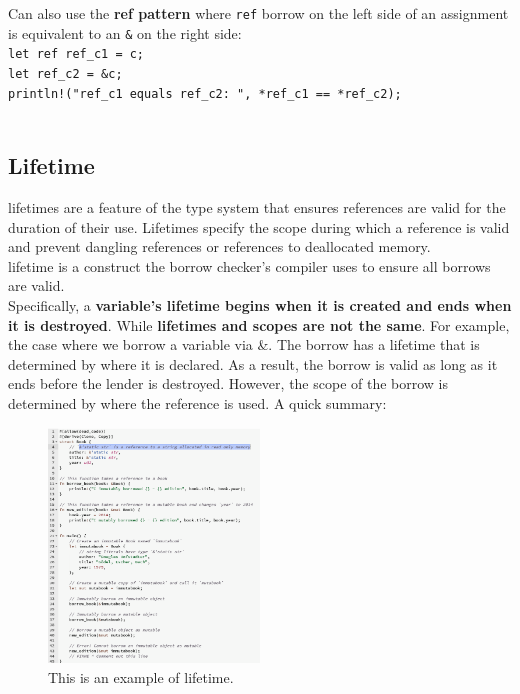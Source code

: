 \documentclass{article}
\begin{document}
Can also use the \textbf{ref pattern} where \texttt{ref} borrow on the left side of an assignment is equivalent to an \texttt{\&} on the right side:\\
\texttt{let ref ref\_c1 = c;}\\
\texttt{let ref\_c2 = \&c;}\\
\texttt{println!("ref\_c1 equals ref\_c2: {}", *ref\_c1 == *ref\_c2);}\\
\\


\subsection{Lifetime}
lifetimes are a feature of the type system that ensures references are valid for the duration of their use. Lifetimes specify the scope during which a reference is valid and prevent dangling references or references to deallocated memory.\\
lifetime is a construct the borrow checker's compiler uses to ensure all borrows are valid.\\ Specifically, a \textbf{variable's lifetime begins when it is created and ends when it is destroyed}. While \textbf{lifetimes and scopes are not the same}.
For example, the case where we borrow a variable via \&. The borrow has a lifetime that is determined by where it is declared. As a result, the borrow is valid as long as it ends before the lender is destroyed. However, the scope of the borrow is determined by where the reference is used. A quick summary:

\begin{figure}[h]
  \centering
  \includegraphics[width=0.5\textwidth]{images/mutable_reference.png} 
  \caption{This is an example of lifetime.}
  \label{fig:lifetime_example}
\end{figure}
\end{document}
